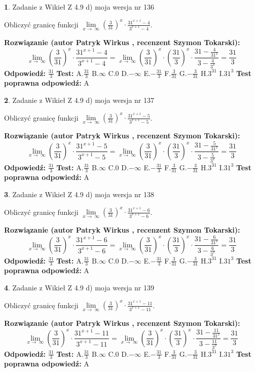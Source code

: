 \documentclass[12pt, a4paper]{article}
\theoremstyle{definition} %
\newtheorem{zad}{}
\newcommand{\zadStart}[1]{\begin{zad}#1\newline}
\newcommand{\zadStop}{\end{zad}}
\newcommand{\rozwStart}[2]{\noindent \textbf{Rozwiązanie (autor #1 , recenzent #2): }\newline}
\newcommand{\rozwStop}{\newline}
\newcommand{\odpStart}{\noindent \textbf{Odpowiedź:}\newline}
\newcommand{\odpStop}{\newline}
\newcommand{\testStart}{\noindent \textbf{Test:}\newline}
\newcommand{\testStop}{\newline}
\newcommand{\kluczStart}{\noindent \textbf{Test poprawna odpowiedź:}\newline}
\newcommand{\kluczStop}{\newline}
\begin{document}
\zadStart{Zadanie z Wikieł Z 4.9 d) moja wersja nr 136}


Obliczyć granicę funkcji  $\lim\limits_{x\to\ \infty}(\frac{3}{31})^{x}\cdot\frac{31^{x+1}-4}{3^{x+1}-4}$.
\zadStop
\rozwStart{Patryk Wirkus}{Szymon Tokarski}
$$\lim\limits_{x\to\ \infty}(\frac{3}{31})^{x}\cdot\frac{31^{x+1}-4}{3^{x+1}-4}=\lim\limits_{x\to\ \infty}(\frac{3}{31})^{x}\cdot(\frac{31}{3})^{x} \cdot \frac{31-\frac{4}{31^{x}}}{3-\frac{4}{3^{x}}} = \frac{31}{3}$$
\rozwStop
\odpStart
$\frac{31}{3}$
\odpStop
\testStart
A.$\frac{31}{3}$ B.$\infty$ C.$0$ D.$-\infty$ E.$-\frac{31}{3}$
F.$\frac{3}{31}$ G.$-\frac{3}{31}$
H.$3^{31}$
I.$31^{3}$
\testStop
\kluczStart
A
\kluczStop



\zadStart{Zadanie z Wikieł Z 4.9 d) moja wersja nr 137}


Obliczyć granicę funkcji  $\lim\limits_{x\to\ \infty}(\frac{3}{31})^{x}\cdot\frac{31^{x+1}-5}{3^{x+1}-5}$.
\zadStop
\rozwStart{Patryk Wirkus}{Szymon Tokarski}
$$\lim\limits_{x\to\ \infty}(\frac{3}{31})^{x}\cdot\frac{31^{x+1}-5}{3^{x+1}-5}=\lim\limits_{x\to\ \infty}(\frac{3}{31})^{x}\cdot(\frac{31}{3})^{x} \cdot \frac{31-\frac{5}{31^{x}}}{3-\frac{5}{3^{x}}} = \frac{31}{3}$$
\rozwStop
\odpStart
$\frac{31}{3}$
\odpStop
\testStart
A.$\frac{31}{3}$ B.$\infty$ C.$0$ D.$-\infty$ E.$-\frac{31}{3}$
F.$\frac{3}{31}$ G.$-\frac{3}{31}$
H.$3^{31}$
I.$31^{3}$
\testStop
\kluczStart
A
\kluczStop



\zadStart{Zadanie z Wikieł Z 4.9 d) moja wersja nr 138}


Obliczyć granicę funkcji  $\lim\limits_{x\to\ \infty}(\frac{3}{31})^{x}\cdot\frac{31^{x+1}-6}{3^{x+1}-6}$.
\zadStop
\rozwStart{Patryk Wirkus}{Szymon Tokarski}
$$\lim\limits_{x\to\ \infty}(\frac{3}{31})^{x}\cdot\frac{31^{x+1}-6}{3^{x+1}-6}=\lim\limits_{x\to\ \infty}(\frac{3}{31})^{x}\cdot(\frac{31}{3})^{x} \cdot \frac{31-\frac{6}{31^{x}}}{3-\frac{6}{3^{x}}} = \frac{31}{3}$$
\rozwStop
\odpStart
$\frac{31}{3}$
\odpStop
\testStart
A.$\frac{31}{3}$ B.$\infty$ C.$0$ D.$-\infty$ E.$-\frac{31}{3}$
F.$\frac{3}{31}$ G.$-\frac{3}{31}$
H.$3^{31}$
I.$31^{3}$
\testStop
\kluczStart
A
\kluczStop



\zadStart{Zadanie z Wikieł Z 4.9 d) moja wersja nr 139}


Obliczyć granicę funkcji  $\lim\limits_{x\to\ \infty}(\frac{3}{31})^{x}\cdot\frac{31^{x+1}-11}{3^{x+1}-11}$.
\zadStop
\rozwStart{Patryk Wirkus}{Szymon Tokarski}
$$\lim\limits_{x\to\ \infty}(\frac{3}{31})^{x}\cdot\frac{31^{x+1}-11}{3^{x+1}-11}=\lim\limits_{x\to\ \infty}(\frac{3}{31})^{x}\cdot(\frac{31}{3})^{x} \cdot \frac{31-\frac{11}{31^{x}}}{3-\frac{11}{3^{x}}} = \frac{31}{3}$$
\rozwStop
\odpStart
$\frac{31}{3}$
\odpStop
\testStart
A.$\frac{31}{3}$ B.$\infty$ C.$0$ D.$-\infty$ E.$-\frac{31}{3}$
F.$\frac{3}{31}$ G.$-\frac{3}{31}$
H.$3^{31}$
I.$31^{3}$
\testStop
\kluczStart
A
\kluczStop
\end{document}

